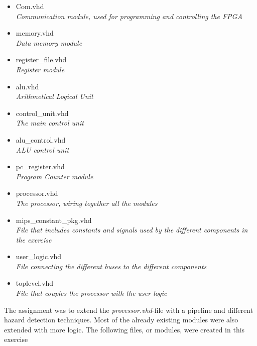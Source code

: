 \begin{itemize}
    \item Com.vhd \hfill \\
        \textit{Communication module, used for programming and controlling the FPGA}
    \item memory.vhd \hfill \\
        \textit{Data memory module}
    \item register\_file.vhd \hfill \\
        \textit{Register module}
    \item alu.vhd \hfill \\
        \textit{Arithmetical Logical Unit}
    \item control\_unit.vhd \hfill \\
        \textit{The main control unit}
    \item alu\_control.vhd \hfill \\
        \textit{ALU control unit}
    \item pc\_register.vhd \hfill \\
        \textit{Program Counter module}
    \item processor.vhd \hfill \\
        \textit{The processor, wiring together all the modules}
    \item mips\_constant\_pkg.vhd \hfill \\
        \textit{File that includes constants and signals used by the different components in the exercise}
    \item user\_logic.vhd \hfill \\
        \textit{File connecting the different buses to the different components}
    \item toplevel.vhd \hfill \\
        \textit{File that couples the processor with the user logic}
\end{itemize}
The assignment was to extend the \textit{processor.vhd}-file with a pipeline and
different hazard detection techniques. Most of the
already existing modules were also extended with more logic.
The following files, or modules, were created in this
exercise


